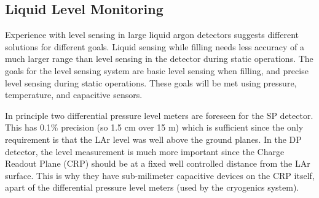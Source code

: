 \subsection{Liquid Level Monitoring}
\label{sec:fdsp-slow-cryo-liq-lev}

Experience with level sensing in large liquid argon detectors suggests
different solutions for different goals.  Liquid sensing while filling needs
less accuracy of a much larger range than level sensing in the detector during
static operations.
The goals for the level sensing system are basic level sensing when filling, and precise level sensing during static operations. These goals will be met using pressure, temperature, and capacitive sensors.


In principle two differential pressure level meters are foreseen for the SP detector. This has 0.1\% precision (so 1.5 cm over 15 m) which is sufficient since the only requirement is that the LAr level was well above the ground planes.
In the DP detector, the level measurement is much more important since the Charge Readout Plane (CRP) should be at a fixed well controlled distance from the LAr surface. This is why they have sub-milimeter capacitive 
devices on the CRP itself, apart of the differential pressure level meters (used by the cryogenics system). 
 
